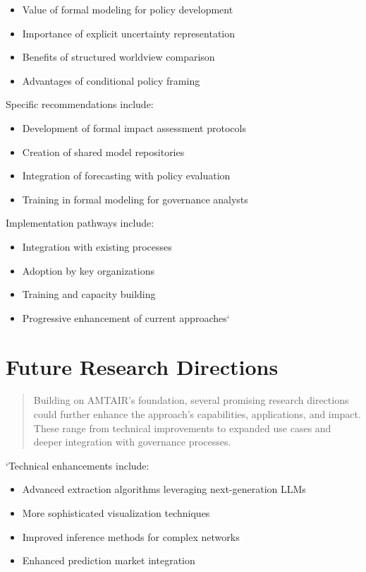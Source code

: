 \documentclass[12pt,a4paper]{report}
\providecommand{\tightlist}{%
  \setlength{\itemsep}{0pt}\setlength{\parskip}{0pt}}
\begin{document}
\begin{itemize}
\tightlist
\item
  Value of formal modeling for policy development
\item
  Importance of explicit uncertainty representation
\item
  Benefits of structured worldview comparison
\item
  Advantages of conditional policy framing
\end{itemize}

Specific recommendations include:

\begin{itemize}
\tightlist
\item
  Development of formal impact assessment protocols
\item
  Creation of shared model repositories
\item
  Integration of forecasting with policy evaluation
\item
  Training in formal modeling for governance analysts
\end{itemize}

Implementation pathways include:

\begin{itemize}
\tightlist
\item
  Integration with existing processes
\item
  Adoption by key organizations
\item
  Training and capacity building
\item
  Progressive enhancement of current approaches`
\end{itemize}

\section{Future Research Directions}\label{sec-future-research}

\begin{quote}
Building on AMTAIR's foundation, several promising research directions
could further enhance the approach's capabilities, applications, and
impact. These range from technical improvements to expanded use cases
and deeper integration with governance processes.
\end{quote}

`Technical enhancements include:

\begin{itemize}
\tightlist
\item
  Advanced extraction algorithms leveraging next-generation LLMs
\item
  More sophisticated visualization techniques
\item
  Improved inference methods for complex networks
\item
  Enhanced prediction market integration
\end{itemize}
\end{document}
